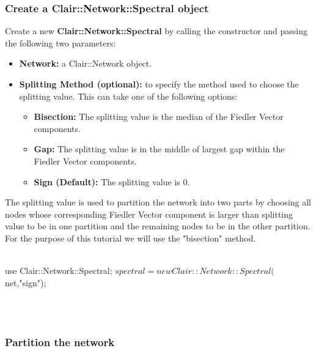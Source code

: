 \subsubsection{Create a Clair::Network::Spectral object}

Create a new \textbf{Clair::Network::Spectral} by calling the constructor and passing the following two parameters:
\begin{itemize}
  \item \textbf{Network:} a Clair::Network object.
  \item \textbf{Splitting Method (optional):} to specify the method used to choose the splitting value. This can take one of the following options:
      \begin{itemize}
        \item \textbf{Bisection:} The splitting value is the median of the Fiedler Vector components.
        \item \textbf{Gap:} The splitting value is in the middle of largest gap within the Fiedler Vector components.
        \item \textbf{Sign (Default):} The splitting value is 0.
      \end{itemize}
\end{itemize}


The splitting value is used to partition the network into two parts by choosing all nodes whose corresponding Fiedler Vector component is larger than splitting value to be in one partition and the remaining nodes to be in the other partition. For the purpose of this tutorial we will use the "bisection" method.
\\
\\
\begin{boxedverbatim}
 use Clair::Network::Spectral;
 $spectral = new Clair::Network::Spectral($net,"sign");
\end{boxedverbatim}
\\
\\

\subsubsection{Partition the network}

